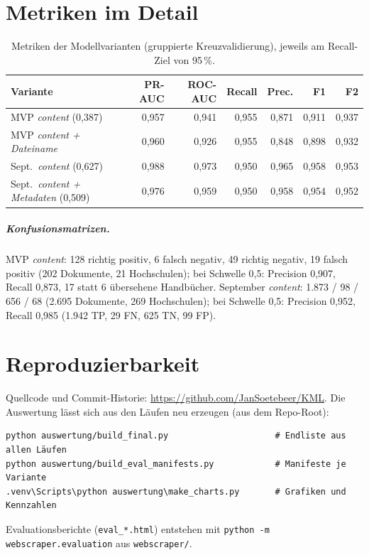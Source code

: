 \chapter{Metriken im Detail}\label{app:metriken}
\begin{table}[htbp]
\centering\small
\caption{Metriken der Modellvarianten (gruppierte Kreuzvalidierung), jeweils am Recall-Ziel von 95\,\%.}
\begin{tabular}{@{}l r r r r r r@{}}
\toprule
\textbf{Variante} & \textbf{PR-AUC} & \textbf{ROC-AUC} & \textbf{Recall} & \textbf{Prec.} & \textbf{F1} & \textbf{F2} \\
\midrule
MVP \emph{content} (0,387) & 0,957 & 0,941 & 0,955 & 0,871 & 0,911 & 0,937 \\
MVP \emph{content + Dateiname} & 0,960 & 0,926 & 0,955 & 0,848 & 0,898 & 0,932 \\
Sept.\ \emph{content} (0,627) & 0,988 & 0,973 & 0,950 & 0,965 & 0,958 & 0,953 \\
Sept.\ \emph{content + Metadaten} (0,509) & 0,976 & 0,959 & 0,950 & 0,958 & 0,954 & 0,952 \\
\bottomrule
\end{tabular}
\end{table}
\paragraph{Konfusionsmatrizen.} MVP \emph{content}: 128 richtig positiv, 6 falsch negativ, 49 richtig negativ, 19 falsch positiv (202 Dokumente, 21 Hochschulen); bei Schwelle 0,5: Precision 0,907, Recall 0,873, 17 statt 6 übersehene Handbücher. September \emph{content}: 1.873 / 98 / 656 / 68 (2.695 Dokumente, 269 Hochschulen); bei Schwelle 0,5: Precision 0,952, Recall 0,985 (1.942 TP, 29 FN, 625 TN, 99 FP).

\chapter{Reproduzierbarkeit}\label{app:repro}
Quellcode und Commit-Historie: \url{https://github.com/JanSoetebeer/KML}. Die Auswertung lässt sich aus den Läufen neu erzeugen (aus dem Repo-Root):
\begin{lstlisting}
python auswertung/build_final.py                     # Endliste aus allen Läufen
python auswertung/build_eval_manifests.py            # Manifeste je Variante
.venv\Scripts\python auswertung\make_charts.py       # Grafiken und Kennzahlen
\end{lstlisting}
Evaluationsberichte (\texttt{eval\_*.html}) entstehen mit \texttt{python -m webscraper.evaluation} aus \texttt{webscraper/}.

